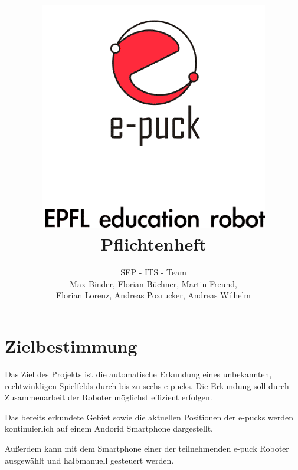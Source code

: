 \documentclass[10pt,a4paper]{article}
\title{
	\includegraphics[width=10cm]{logo.png} \\
	\vspace{1cm}
	Pflichtenheft
}
\author{SEP - ITS - Team \\ Max Binder, Florian Büchner, Martin Freund, \\Florian Lorenz,
											Andreas Poxrucker, Andreas Wilhelm}
\begin{document}
	\maketitle
	\newpage
	\tableofcontents	
	\newpage
	
	\section{Zielbestimmung}
		Das Ziel des Projekts ist die automatische Erkundung eines unbekannten, rechtwinkligen Spielfelds durch bis zu
		sechs e-pucks. Die Erkundung soll durch Zusammenarbeit der Roboter möglichst effizient erfolgen.
		
		Das bereits erkundete Gebiet sowie die aktuellen Positionen der e-pucks werden kontinuierlich auf einem
		Andorid Smartphone dargestellt.
		
		Außerdem kann mit dem Smartphone einer der teilnehmenden e-puck Roboter ausgewählt und halbmanuell gesteuert werden.
\end{document}
